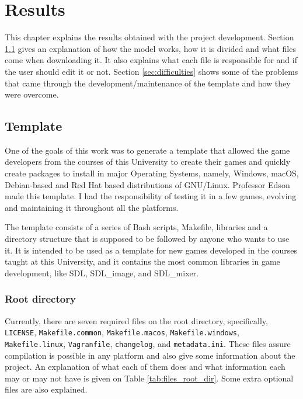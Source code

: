 \chapter[Results]{Results}
\label{sec:results}

This chapter explains the results obtained with the project development. Section \ref{sec:template} gives an explanation of how the model works, how it is divided and what files come when downloading it. It also explains what each file is responsible for and if the user should edit it or not. Section \ref{sec:difficulties} shows some of the problems that came through the development/maintenance of the template and how they were overcome.


\section{Template}
\label{sec:template}

One of the goals of this work was to generate a template that allowed the game developers from the courses of this University to create their games and quickly create packages to install in major Operating Systems, namely, Windows, macOS, Debian-based and Red Hat based distributions of GNU/Linux. Professor Edson made this template.  I had the responsibility of testing it in a few games, evolving and maintaining it throughout all the platforms.

The template consists of a series of Bash scripts, Makefile, libraries and a directory structure that is supposed to be followed by anyone who wants to use it. It is intended to be used as a template for new games developed in the courses taught at this University, and it contains the most common libraries in game development, like SDL, SDL\_image, and SDL\_mixer.

\subsection{Root directory}
\label{sec:root_directory}

Currently, there are seven required files on the root directory, specifically, \texttt{LICENSE}, \texttt{Makefile.common}, \texttt{Makefile.macos}, \texttt{Makefile.windows}, \texttt{Makefile.linux}, \texttt{Vagranfile}, \texttt{changelog}, and \texttt{metadata.ini}. These files assure compilation is possible in any platform and also give some information about the project. An explanation of what each of them does and what information each may or may not have is given on Table \ref{tab:files_root_dir}. Some extra optional files are also explained.


